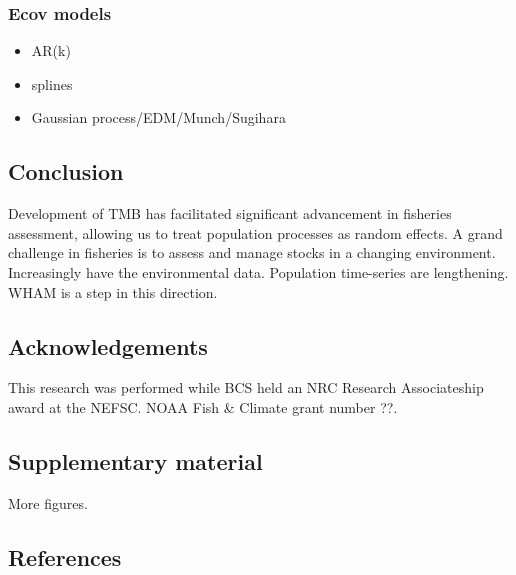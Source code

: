 \documentclass[]{article}
\providecommand{\tightlist}{%
  \setlength{\itemsep}{0pt}\setlength{\parskip}{0pt}}
\begin{document}
\hypertarget{ecov-models}{%
\subsubsection{Ecov models}\label{ecov-models}}

\begin{itemize}
\tightlist
\item
  AR(k)
\item
  splines
\item
  Gaussian process/EDM/Munch/Sugihara
\end{itemize}

\hypertarget{conclusion}{%
\subsection{Conclusion}\label{conclusion}}

Development of TMB has facilitated significant advancement in fisheries
assessment, allowing us to treat population processes as random effects.
A grand challenge in fisheries is to assess and manage stocks in a
changing environment. Increasingly have the environmental data.
Population time-series are lengthening. WHAM is a step in this
direction.

\hypertarget{acknowledgements}{%
\subsection*{Acknowledgements}\label{acknowledgements}}

This research was performed while BCS held an NRC Research Associateship
award at the NEFSC. NOAA Fish \& Climate grant number ??.

\pagebreak

\hypertarget{supplementary-material}{%
\subsection*{Supplementary material}\label{supplementary-material}}

More figures.

\pagebreak

\hypertarget{references}{%
\subsection*{References}\label{references}}
\end{document}
